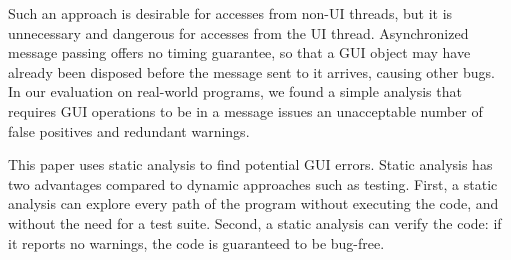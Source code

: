 Such an approach is desirable for accesses from non-UI threads, but it is unnecessary
and dangerous for accesses from the UI thread. Asynchronized message passing offers
no timing guarantee, so that a GUI object may have already been
disposed before the message sent to it arrives, causing other bugs. 
In our evaluation on real-world programs, we found a simple analysis that
requires GUI operations to be in a message issues
an unacceptable number of false positives and redundant warnings.




This paper uses static analysis to find potential GUI errors.
Static analysis has two advantages compared to dynamic approaches such as
 testing. First, a static analysis can explore every path of the program without
executing the code, and without the need for a test suite.
Second, a static analysis can verify the code: if it
reports no warnings, the code is guaranteed to be bug-free. 


